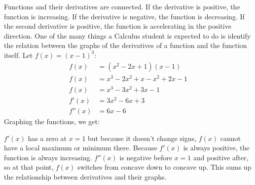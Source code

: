 \documentclass[../revisedMain.tex]{subfiles}
\begin{document}
	Functions and their derivatives are connected. If the derivative is positive, the function is increasing. If the derivative is negative, the function is decreasing. If the second derivative is positive, the function is accelerating in the positive direction. One of the many things a Calculus student is expected to do is identify the relation between the graphs of the derivatives of a function and the function itself. Let $f(x)=(x-1)^3$: 
	\begin{equation}
		\begin{split}
			f(x)&=(x^2-2x+1)(x-1)\\
			f(x)&=x^3-2x^2+x-x^2+2x-1\\
			f(x)&=x^3-3x^2+3x-1\\
			f'(x)&=3x^2-6x+3\\
			f''(x)&=6x-6
		\end{split}
	\end{equation}
	Graphing the functions, we get:
			\begin{center}
			\end{center}
			$f'(x)$ has a zero at $x=1$ but because it doesn't change signs, $f(x)$ cannot have a local maximum or minimum there. Because $f'(x)$ is always positive, the function is always increasing. $f''(x)$ is negative before $x=1$ and positive after, so at that point, $f(x)$ switches from concave down to concave up. This sums up the relationship between derivatives and their graphs.
\end{document}
